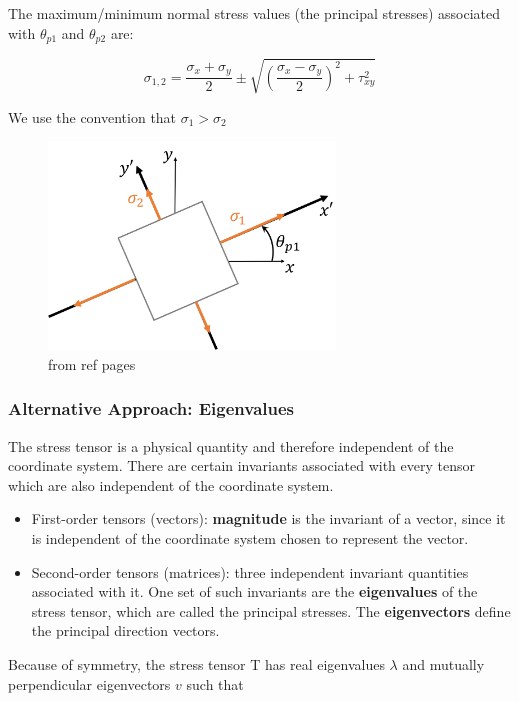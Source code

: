 \noindent The maximum/minimum normal stress values (the principal stresses) associated with $\theta_{p1}$ and $\theta_{p2}$ are:

\[\sigma_{1,2} = \frac{\sigma_x +\sigma_y}{2} \pm \sqrt{(\frac{\sigma_x - \sigma_y}{2})^2 + \tau_{xy}^2}\]

\noindent We use the convention that $\sigma_1 > \sigma_2$

\begin{figure}[!h]
\centering
\includegraphics[angle=0, width=3in]{Stress Transformation-Figures/principalStressesElement.png}
\vspace{-2mm}
\caption{\small from ref pages}
\vspace{-3mm}
\label{Fig:PrinStressElem}
\end{figure}

\subsubsection{Alternative Approach: Eigenvalues}

The stress tensor is a physical quantity and therefore independent of the coordinate system. There are certain invariants associated with every tensor which are also independent of the coordinate system.

\begin{itemize}
    \item First-order tensors (vectors): \textbf{magnitude} is the invariant of a vector, since it is independent of the coordinate system chosen to represent the vector.
    \item Second-order tensors (matrices): three independent invariant quantities associated with it. One set of such invariants are the \textbf{eigenvalues} of the stress tensor, which are called the principal stresses. The \textbf{eigenvectors} define the principal direction vectors.
\end{itemize}

\noindent Because of symmetry, the stress tensor T has real eigenvalues $\lambda$ and mutually perpendicular eigenvectors $v$ such that

